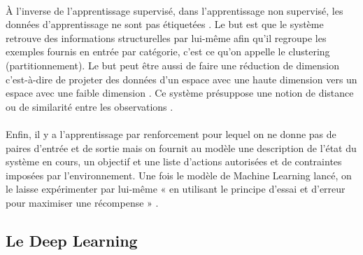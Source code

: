 \documentclass{article}
\begin{document}
\paragraph{}
À l’inverse de l’apprentissage supervisé, dans l’apprentissage non supervisé, les données d’apprentissage ne sont pas étiquetées \cite{janiesch2021machine, lemberger2019big}. Le but est que le système retrouve des informations structurelles par lui-même afin qu’il regroupe les exemples fournis en entrée par catégorie, c’est ce qu’on appelle le clustering (partitionnement). Le but peut être aussi de faire une réduction de dimension c’est-à-dire de projeter des données d’un espace avec une haute dimension vers un espace avec une faible dimension \cite{janiesch2021machine}. Ce système présuppose une notion de distance ou de similarité entre les observations \cite{lemberger2019big}. 
\paragraph{}
Enfin, il y a l’apprentissage par renforcement pour lequel on ne donne pas de paires d’entrée et de sortie mais on fournit au modèle une description de l’état du système en cours, un objectif et une liste d’actions autorisées et de contraintes imposées par l’environnement. Une fois le modèle de Machine Learning lancé, on le laisse expérimenter par lui-même « en utilisant le principe d’essai et d’erreur pour maximiser une récompense » \cite{janiesch2021machine}. 
\subsection{Le Deep Learning}
\end{document}
